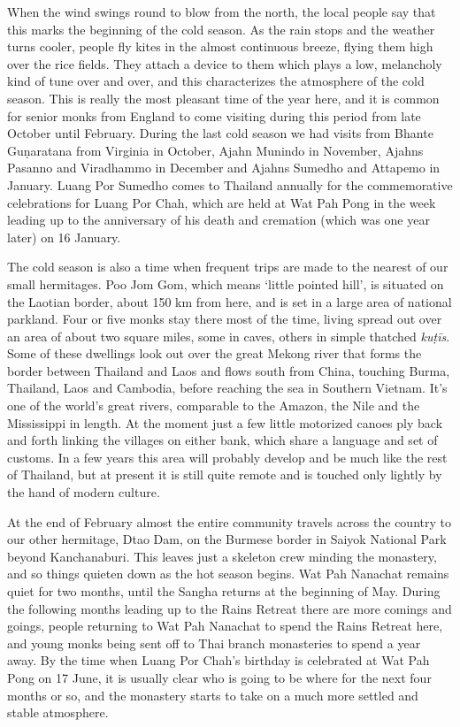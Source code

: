 When the wind swings round to blow from the north, the local people say
that this marks the beginning of the cold season. As the rain stops and
the weather turns cooler, people fly kites in the almost continuous
breeze, flying them high over the rice fields. They attach a device to
them which plays a low, melancholy kind of tune over and over, and this
characterizes the atmosphere of the cold season. This is really the most
pleasant time of the year here, and it is common for senior monks from
England to come visiting during this period from late October until
February. During the last cold season we had visits from Bhante
Guṇaratana from Virginia in October, Ajahn Munindo in November, Ajahns
Pasanno and Viradhammo in December and Ajahns Sumedho and Attapemo in
January. Luang Por Sumedho comes to Thailand annually for the
commemorative celebrations for Luang Por Chah, which are held at Wat Pah
Pong in the week leading up to the anniversary of his death and
cremation (which was one year later) on 16 January. 

The cold season is also a time when frequent trips are made to the
nearest of our small hermitages. Poo Jom Gom, which means `little
pointed hill', is situated on the Laotian border, about 150 km from
here, and is set in a large area of national parkland. Four or five
monks stay there most of the time, living spread out over an area of
about two square miles, some in caves, others in simple thatched
\emph{kuṭīs}. Some of these dwellings look out over the great Mekong
river that forms the border between Thailand and Laos and flows south
from China, touching Burma, Thailand, Laos and Cambodia, before reaching
the sea in Southern Vietnam. It's one of the world's great rivers, 
comparable to the Amazon, the Nile and the Mississippi in length. At the
moment just a few little motorized canoes ply back and forth linking the
villages on either bank, which share a language and set of customs. In a
few years this area will probably develop and be much like the rest of
Thailand, but at present it is still quite remote and is touched only
lightly by the hand of modern culture. 

At the end of February almost the entire community travels across the
country to our other hermitage, Dtao Dam, on the Burmese border in
Saiyok National Park beyond Kanchanaburi. This leaves just a skeleton
crew minding the monastery, and so things quieten down as the hot season
begins. Wat Pah Nanachat remains quiet for two months, until the Sangha
returns at the beginning of May. During the following months leading up
to the Rains Retreat there are more comings and goings, people returning
to Wat Pah Nanachat to spend the Rains Retreat here, and young monks
being sent off to Thai branch monasteries to spend a year away. By the
time when Luang Por Chah's birthday is celebrated at Wat Pah Pong on 17
June, it is usually clear who is going to be where for the next four
months or so, and the monastery starts to take on a much more settled
and stable atmosphere. 

